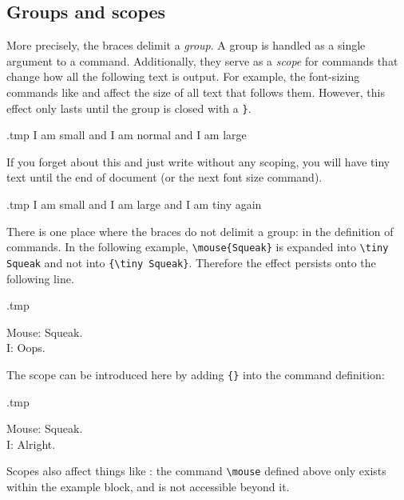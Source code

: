 %
\subsection{Groups and scopes}

More precisely, the braces delimit a \emph{group}.
A group is handled as a single argument to a command.
Additionally, they serve as a \emph{scope} for commands that change
how all the following text is output.
For example, the font-sizing commands like  and 
affect the size of all text that follows them.
However, this effect only lasts until the group is closed with a \verb|}|.

\begin{VerbatimOut}{\jobname.tmp}
{\tiny I am small}
and I am normal
and {\Large I am large}
\end{VerbatimOut}
\ShowExample

If you forget about this and just write  without any scoping,
you will have tiny text until the end of document (or the next font size command).

\begin{VerbatimOut}{\jobname.tmp}
\tiny I am small and
{\Large I am large}
and I am tiny again
\end{VerbatimOut}
\ShowExample

There is one place where the braces do not delimit a group:
in the definition of commands.
In the following example, \verb|\mouse{Squeak}| is expanded into
\verb|\tiny Squeak| and not into \verb|{\tiny Squeak}|.
Therefore the effect persists onto the following line.
%
\begin{VerbatimOut}{\jobname.tmp}
\newcommand{\mouse}[1]{Mouse: \tiny#1.}

\mouse{Squeak}\\
I: Oops.
\end{VerbatimOut}
\ShowExample
%
The scope can be introduced here by adding \verb|{}| into the command definition:
%
\begin{VerbatimOut}{\jobname.tmp}
\newcommand{\mouse}[1]{{Mouse: \tiny#1.}}

\mouse{Squeak}\\
I: Alright.
\end{VerbatimOut}
\ShowExample

Scopes also affect things like :
the command \verb|\mouse| defined above only exists
within the example block, and is not accessible beyond it.



